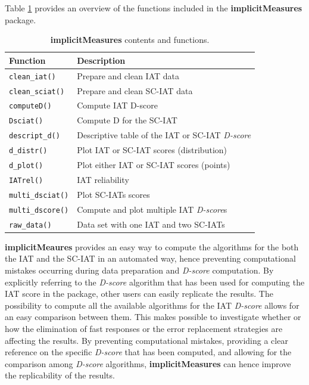 \documentclass[12pt]{book}
\begin{document}
 Table \ref{tab:implicitmeasures} provides an overview of the functions included in the \textbf{implicitMeasures} package.
\begin{table}[h!]
	\centering \onehalfspacing
	\caption{\label{tab:implicitmeasures} \textbf{implicitMeasures} contents and functions.}
	\begin{tabular}{p{5cm} p{9cm}}
		\hline
		Function & Description \\
		\hline
		\texttt{clean\_iat()} & Prepare and clean IAT data\\
		\texttt{clean\_sciat()} & Prepare and clean SC-IAT data\\
		\texttt{computeD()} & Compute IAT D-score\\
		\texttt{Dsciat()} & Compute D for the SC-IAT\\
		\texttt{descript\_d()} & Descriptive table of the IAT or SC-IAT \emph{D-score}\\  
		\texttt{d\_distr()} & Plot IAT or SC-IAT scores (distribution)\\
		\texttt{d\_plot()} & Plot either IAT or SC-IAT scores (points)\\
		\texttt{IATrel()} & IAT reliability\\
		\texttt{multi\_dsciat()} & Plot SC-IATs scores\\
		\texttt{multi\_dscore()} & Compute and plot multiple IAT \emph{D-score}s\\
		\texttt{raw\_data()} & Data set with one IAT and two SC-IATs\\
		\hline
	\end{tabular}
\end{table}

\textbf{implicitMeaures} provides an easy way to compute the algorithms for the both the IAT and the SC-IAT in an automated way, hence preventing computational mistakes occurring during data preparation and \emph{D-score} computation. By explicitly referring to the \emph{D-score} algorithm that has been used for computing the IAT score in the package, other users can easily replicate the results. The possibility to compute all the available algorithms for the IAT \emph{D-score} allows for an easy comparison between them. This makes possible to investigate whether or how the elimination of fast responses or the error replacement strategies are affecting the results. 
By preventing computational mistakes, providing a clear reference on the specific \emph{D-score} that has been computed, and allowing for the comparison among \emph{D-score} algorithms, \textbf{implicitMeasures} can hence improve the replicability of the results.
\end{document}
